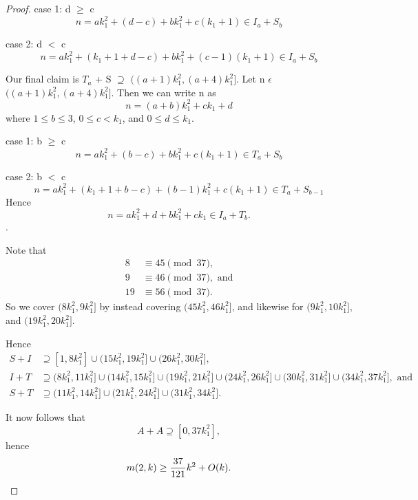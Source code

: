 \begin{proof}
case 1: d $\geq$ c
\[
n = ak_1^2 + (d - c) + bk_1^2 + c(k_1 + 1) \in I_a + S_b
\]

case 2: d $<$ c
\[
n = ak_1^2 + (k_1 + 1 + d - c) + bk_1^2 + (c - 1)(k_1 + 1) \in  I_a + S_b
\]

Our final claim is $T_a$ + S $\supseteq$ $((a +1)k_1^2 ,  (a + 4)k_1^2]$. 
Let n $\epsilon$ $((a +1)k_1^2 ,  (a + 4)k_1^2]$.
Then we can write n as 
\[
n = (a + b) k_1^2 + ck_1 + d 
\]
where $1 \leq b \leq 3$, $0 \leq c < k_1$, and $0 \leq d \leq k_1$. 

case 1: b $\geq$ c
\[
n = ak_1^2 + (b - c) + bk_1^2 + c(k_1 + 1) \in T_a + S_b
\]

case 2: b $<$ c
\[
n = ak_1^2 + (k_1 + 1 + b - c) + (b - 1)k_1^2 + c(k_1 + 1) \in  T_a + S_{b-1}
\]
Hence 
\[
n = ak_1^2 + d + bk_1^2 + ck_1 \in I_a + T_b.
\].

Note that
\begin{align*}
8 &\equiv 45\pmod{37},\\
 9 &\equiv 46\pmod{37},  \text{ and} \\
19 &\equiv 56\pmod{37 }.
\end{align*} 
So we cover $(8k_1^2, 9k_1^2]$ by instead covering $(45k_1^2, 46k_1^2]$, and likewise for $(9k_1^2, 10k_1^2]$, and $(19k_1^2, 20k_1^2]$. 

Hence 
\begin{align*}
S + I &\supseteq [1, 8k_1^2] \cup (15k_1^2, 19k_1^2] \cup (26k_1^2, 30k_1^2],\\
I + T &\supseteq (8k_1^2, 11k_1^2] \cup (14k_1^2, 15k_1^2] \cup (19k_1^2, 21k_1^2] \cup (24k_1^2, 26k_1^2] \cup (30k_1^2, 31k_1^2] \cup (34k_1^2, 37k_1^2],\text{ and}\\
S + T &\supseteq (11k_1^2, 14k_1^2] \cup (21k_1^2, 24k_1^2] \cup (31k_1^2, 34k_1^2]. 
\end{align*}

It now follows that 
\[
A + A \supseteq [0, 37k_1^2],
\]
hence
\[
m(2,k) \geq \frac{37}{121}k^2 + O(k). \qedhere
\]
\end{proof}
